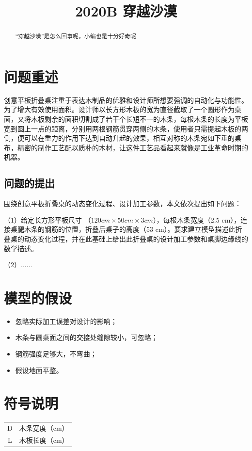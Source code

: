 \documentclass{zzblmod}
\title{2020B 穿越沙漠}
\begin{document}
\maketitle

\begin{abstract}
	“穿越沙漠”是怎么回事呢，小编也是十分好奇呢
\end{abstract}

\tableofcontents
\newpage

\section{问题重述}

创意平板折叠桌注重于表达木制品的优雅和设计师所想要强调的自动化与功能性。为了增大有效使用面积。设计师以长方形木板的宽为直径截取了一个圆形作为桌面，又将木板剩余的面积切割成了若干个长短不一的木条，每根木条的长度为平板宽到圆上一点的距离，分别用两根钢筋贯穿两侧的木条，使用者只需提起木板的两侧，便可以在重力的作用下达到自动升起的效果，相互对称的木条宛如下垂的桌布，精密的制作工艺配以质朴的木材，让这件工艺品看起来就像是工业革命时期的机器。

\subsection{问题的提出}

围绕创意平板折叠桌的动态变化过程、设计加工参数，本文依次提出如下问题：

（1）给定长方形平板尺寸 （$120 cm \times 50 cm \times 3 cm$），每根木条宽度（2.5 cm），连接桌腿木条的钢筋的位置，折叠后桌子的高度（53 cm）。要求建立模型描述此折叠桌的动态变化过程，并在此基础上给出此折叠桌的设计加工参数和桌脚边缘线的数学描述。

（2）......


\section{模型的假设}

\begin{itemize}
	\item 忽略实际加工误差对设计的影响；
	\item 木条与圆桌面之间的交接处缝隙较小，可忽略；
	\item 钢筋强度足够大，不弯曲；
	\item 假设地面平整。
\end{itemize}

\section{符号说明}
\begin{center}
	\begin{tabular}{cc}
		\hline
		\makebox[0.3\textwidth][c]{符号}	&  \makebox[0.4\textwidth][c]{意义} \\ \hline
		D	    & 木条宽度（cm） \\ \hline
		L	    & 木板长度（cm）  \\ \hline
	\end{tabular}
\end{center}
\end{document}
